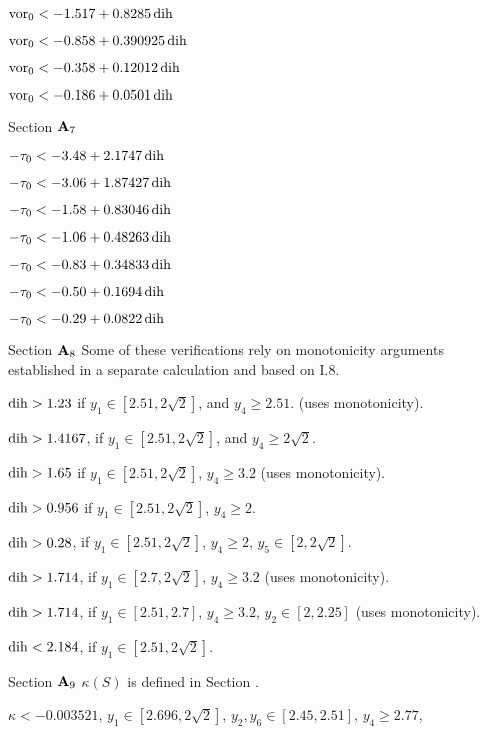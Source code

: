  $\operatorname{vor}_0 < -1.517 + 0.8285 \operatorname{dih}$

 $\operatorname{vor}_0 < -0.858 + 0.390925 \operatorname{dih}$

 $\operatorname{vor}_0 < -0.358 + 0.12012 \operatorname{dih}$

 $\operatorname{vor}_0 < -0.186 + 0.0501 \operatorname{dih}$

\subhead Section ${\bold A}_7$\endsubhead

 $-\tau_0 < -3.48 + 2.1747 \operatorname{dih}$

 $-\tau_0 < -3.06 + 1.87427 \operatorname{dih}$

 $-\tau_0 < -1.58 + 0.83046 \operatorname{dih}$

 $-\tau_0 < -1.06 + 0.48263 \operatorname{dih}$

 $-\tau_0 < -0.83 + 0.34833 \operatorname{dih}$

 $-\tau_0 < -0.50 + 0.1694 \operatorname{dih}$

 $-\tau_0 < -0.29 + 0.0822 \operatorname{dih}$

\subhead Section ${\bold A}_8$\endsubhead
Some of these verifications rely on monotonicity arguments
established in a separate calculation and based on I.8.

	$\operatorname{dih}>1.23$ if $y_1\in [2.51,2\sqrt{2}]$, and $y_4\ge 2.51$.
	(uses monotonicity).


	$\operatorname{dih} > 1.4167$, if $y_1\in[2.51,2\sqrt{2}]$, and $y_4\ge2\sqrt{2}$.

 $\operatorname{dih}> 1.65$ if $y_1\in[2.51,2\sqrt{2}]$, $y_4\ge3.2$
	(uses monotonicity).
	

 $\operatorname{dih}> 0.956$ if $y_1\in[2.51,2\sqrt{2}]$, $y_4\ge 2$.

 $\operatorname{dih} > 0.28$, if $y_1\in[2.51,2\sqrt{2}]$, $y_4\ge2$,
	$y_5\in[2,2\sqrt{2}]$.


 $\operatorname{dih}> 1.714$, if $y_1\in[2.7,2\sqrt{2}]$, $y_4\ge3.2$
	(uses monotonicity).


 $\operatorname{dih}> 1.714$, if $y_1\in[2.51,2.7]$, $y_4\ge3.2$,
	$y_2\in[2,2.25]$
	(uses monotonicity).


  $\operatorname{dih} < 2.184$, if  $y_1\in[2.51,2\sqrt{2}]$.





\subhead Section ${\bold A}_9$\endsubhead
$\kappa(S)$ is defined in Section .  

 $\kappa< -0.003521$, 
	$y_1\in[2.696,2\sqrt{2}]$, $y_2,y_6\in[2.45,2.51]$,
	$y_4\ge 2.77$,

